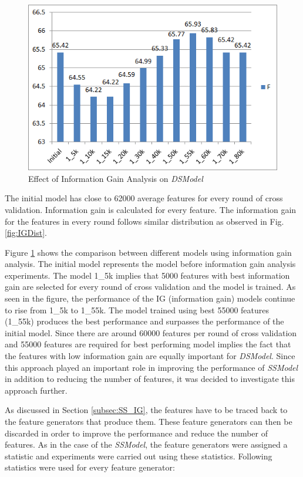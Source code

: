 \begin{figure}
\centering
\includegraphics[scale=0.7]{figures/DSIGResults.png}
\caption{Effect of Information Gain Analysis on \textit{DSModel}}\label{fig:DSIG}
\end{figure}


The initial model has close to 62000 average features for every round of cross validation. Information gain is calculated for every feature. The information gain for the features in every round follows similar distribution as observed in Fig. \ref{fig:IGDist}. 

Figure \ref{fig:DSIG} shows the comparison between different models using information gain analysis. The initial model represents the model before information gain analysis experiments. The model 1\_5k implies that 5000 features with best information gain are selected for every round of cross validation and the model is trained. As seen in the figure, the performance of the IG (information gain) models continue to rise from 1\_5k to 1\_55k. The model trained using best 55000 features (1\_55k) produces the best performance and surpasses the performance of the initial model. Since there are around 60000 features per round of cross validation and 55000 features are required for best performing model implies the fact that the features with low information gain are equally important for \textit{DSModel}. Since this approach played an important role in improving the performance of \textit{SSModel} in addition to reducing the number of features, it was decided to investigate this approach further.

As discussed in Section \ref{subsec:SS_IG}, the features have to be traced back to the feature generators that produce them. These feature generators can then be discarded in order to improve the performance and reduce the number of features. As in the case of the \textit{SSModel}, the feature generators were assigned a statistic and experiments were carried out using these statistics. Following statistics were used for every feature generator:

